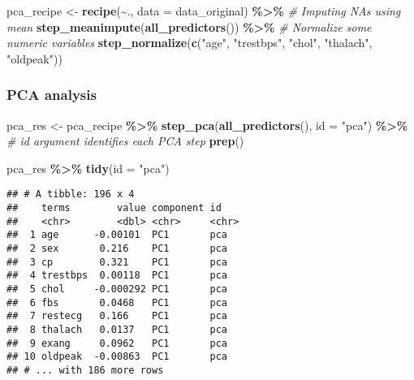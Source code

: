 \documentclass[
]{book}
\newenvironment{Shaded}{\begin{snugshade}}{\end{snugshade}}
\newcommand{\CommentTok}[1]{\textcolor[rgb]{0.56,0.35,0.01}{\textit{#1}}}
\newcommand{\DataTypeTok}[1]{\textcolor[rgb]{0.13,0.29,0.53}{#1}}
\newcommand{\KeywordTok}[1]{\textcolor[rgb]{0.13,0.29,0.53}{\textbf{#1}}}
\newcommand{\NormalTok}[1]{#1}
\newcommand{\OperatorTok}[1]{\textcolor[rgb]{0.81,0.36,0.00}{\textbf{#1}}}
\newcommand{\StringTok}[1]{\textcolor[rgb]{0.31,0.60,0.02}{#1}}
\begin{document}
\begin{Shaded}
\begin{Highlighting}[]
\NormalTok{pca\_recipe \textless{}{-}}\StringTok{ }\KeywordTok{recipe}\NormalTok{(}\OperatorTok{\textasciitilde{}}\NormalTok{., }\DataTypeTok{data =}\NormalTok{ data\_original) }\OperatorTok{\%\textgreater{}\%}
\StringTok{  }\CommentTok{\# Imputing NAs using mean }
\StringTok{  }\KeywordTok{step\_meanimpute}\NormalTok{(}\KeywordTok{all\_predictors}\NormalTok{()) }\OperatorTok{\%\textgreater{}\%}
\StringTok{  }\CommentTok{\# Normalize some numeric variables }
\StringTok{  }\KeywordTok{step\_normalize}\NormalTok{(}\KeywordTok{c}\NormalTok{(}\StringTok{"age"}\NormalTok{, }\StringTok{"trestbps"}\NormalTok{, }\StringTok{"chol"}\NormalTok{, }\StringTok{"thalach"}\NormalTok{, }\StringTok{"oldpeak"}\NormalTok{)) }
\end{Highlighting}
\end{Shaded}

\hypertarget{pca-analysis}{%
\subsubsection{PCA analysis}\label{pca-analysis}}

\begin{Shaded}
\begin{Highlighting}[]
\NormalTok{pca\_res \textless{}{-}}\StringTok{ }\NormalTok{pca\_recipe }\OperatorTok{\%\textgreater{}\%}\StringTok{ }
\StringTok{  }\KeywordTok{step\_pca}\NormalTok{(}\KeywordTok{all\_predictors}\NormalTok{(), }
           \DataTypeTok{id =} \StringTok{"pca"}\NormalTok{) }\OperatorTok{\%\textgreater{}\%}\StringTok{ }\CommentTok{\# id argument identifies each PCA step }
\StringTok{  }\KeywordTok{prep}\NormalTok{()}

\NormalTok{pca\_res }\OperatorTok{\%\textgreater{}\%}
\StringTok{  }\KeywordTok{tidy}\NormalTok{(}\DataTypeTok{id =} \StringTok{"pca"}\NormalTok{) }
\end{Highlighting}
\end{Shaded}

\begin{verbatim}
## # A tibble: 196 x 4
##    terms        value component id   
##    <chr>        <dbl> <chr>     <chr>
##  1 age      -0.00101  PC1       pca  
##  2 sex       0.216    PC1       pca  
##  3 cp        0.321    PC1       pca  
##  4 trestbps  0.00118  PC1       pca  
##  5 chol     -0.000292 PC1       pca  
##  6 fbs       0.0468   PC1       pca  
##  7 restecg   0.166    PC1       pca  
##  8 thalach   0.0137   PC1       pca  
##  9 exang     0.0962   PC1       pca  
## 10 oldpeak  -0.00863  PC1       pca  
## # ... with 186 more rows
\end{verbatim}
\end{document}
